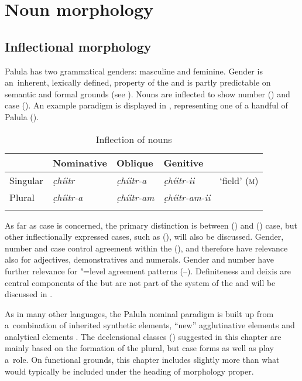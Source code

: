 \section{Noun morphology}
\label{sec:4-2}

\subsection{Inflectional morphology}
\label{subsec:4-2-1}

Palula has two grammatical genders: masculine and feminine. Gender is an~inherent, lexically defined, property of the  and is partly predictable on semantic and formal grounds (see ). Nouns are inflected to show number () and case  (). An example paradigm is displayed in , representing one of a handful of Palula  (). 


\begin{table}[ht]
\caption{Inflection of nouns}
\begin{tabularx}{\textwidth}{ Q Q Q Q Q }
\lsptoprule
&
Nominative &
Oblique &
Genitive &
\\\midrule
Singular &
\textit{c̣híitr} &
\textit{c̣híitr-a} &
\textit{c̣híitr-ii} &
`field' (\textsc{m})\\
Plural &
\textit{c̣híitr-a} &
\textit{c̣híitr-am} &
\textit{c̣híitr-am-ii} &
\\\lspbottomrule
\end{tabularx}
\label{tab:4-nouns}
\end{table}


As far as case  is concerned, the primary distinction is between  () and  () case, but other inflectionally expressed cases, such as  (), will also be discussed. Gender, number and case control agreement within the   (), and therefore have relevance also for adjectives, demonstratives and numerals. Gender and number have further relevance for "=level agreement patterns (--). Definiteness and deixis are central components of the   but are not part of the  system of the  and will be discussed in .


As in many other \iliNIA languages, the Palula nominal paradigm is built up from a~combination of inherited synthetic elements, ``new'' agglutinative elements and analytical elements \citep[212]{masica1991}. The declensional classes () suggested in this chapter are mainly based on the formation of the plural, but case forms as well as  play a~role. On functional grounds, this chapter includes slightly more than what would typically be included under the heading of morphology proper.


